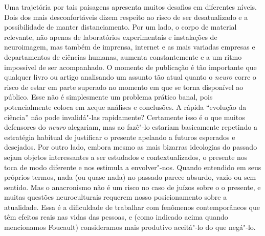 Uma trajetória por tais paisagens apresenta muitos desafios em
diferentes níveis. Dois dos mais desconfortáveis dizem respeito ao risco
de ser desatualizado e a possibilidade de manter distanciamento. Por um
lado, o corpo de material relevante, não apenas de laboratórios
experimentais e instalações de neuroimagem, mas também de imprensa,
internet e as mais variadas empresas e departamentos de ciências
humanas, aumenta constantemente e a um ritmo impossível de ser
acompanhado. O momento de publicação é tão importante que qualquer livro
ou artigo analisando um assunto tão atual quanto o \emph{neuro} corre o
risco de estar em parte superado no momento em que se torna disponível
ao público. Esse não é simplesmente um problema prático banal, pois
potencialmente coloca em xeque análises e conclusões. A rápida
``evolução da ciência'' não pode invalidá"-las rapidamente? Certamente
isso é o que muitos defensores do \emph{neuro} alegariam, mas ao fazê"-lo
estariam basicamente repetindo a estratégia habitual de justificar o
presente apelando a futuros esperados e desejados. Por outro lado,
embora mesmo as mais bizarras ideologias do passado sejam objetos
interessantes a ser estudados e contextualizados, o presente nos toca de
modo diferente e nos estimula a envolver"-nos. Quando entendido em seus
próprios termos, nada (ou quase nada) no passado parece absurdo, vazio
ou sem sentido. Mas o anacronismo não é um risco no caso de juízos sobre
o o presente, e muitas questões neuroculturais requerem nosso
posicionamento sobre a atualidade. Essa é a dificuldade de trabalhar com
fenômenos contemporâneos que têm efeitos reais nas vidas das pessoas, e
(como indicado acima quando mencionamos Foucault) consideramos mais
produtivo aceitá"-lo do que negá"-lo.

